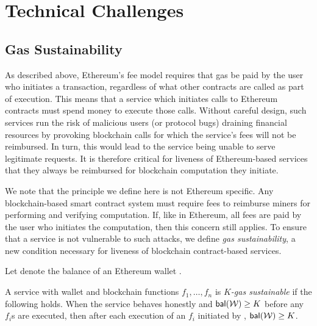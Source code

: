 \section{Technical Challenges}



\subsection{Gas Sustainability}
\label{sec:gas-sustainability}

As described above, Ethereum's fee model requires that gas be paid by the user who initiates a transaction, regardless of what other contracts are called as part of execution.
This means that a service which initiates calls to Ethereum contracts must spend money to execute those calls.
Without careful design, such services run the risk of malicious users (or protocol bugs) draining financial resources by provoking blockchain calls for which the service's fees will not be reimbursed.
In turn, this would lead to the service being unable to serve legitimate requests.
It is therefore critical for liveness of Ethereum-based services that they always be reimbursed for blockchain computation they initiate.

We note that the principle we define here is not Ethereum specific.
Any blockchain-based smart contract system must require fees to reimburse miners for performing and verifying computation.
If, like in Ethereum, all fees are paid by the user who initiates the computation, then this concern still applies.
To ensure that a service is not vulnerable to such attacks, we define \emph{gas sustainability}, a new condition necessary for liveness of blockchain contract-based services.

Let \bal{\wallet} denote the balance of an Ethereum wallet \wallet.

\begin{definition}
  \label{def:gas-sustainability}
  A service with wallet \wallet and blockchain functions $f_1, \dotsc, f_n$ is \emph{$K$-gas sustainable} if the following holds.
  When the service behaves honestly and $\bal{\wallet} \geq K$ before any $f_i$s are executed,
  then after each execution of an $f_i$ initiated by \wallet, $\bal{\wallet} \geq K$.
\end{definition}

